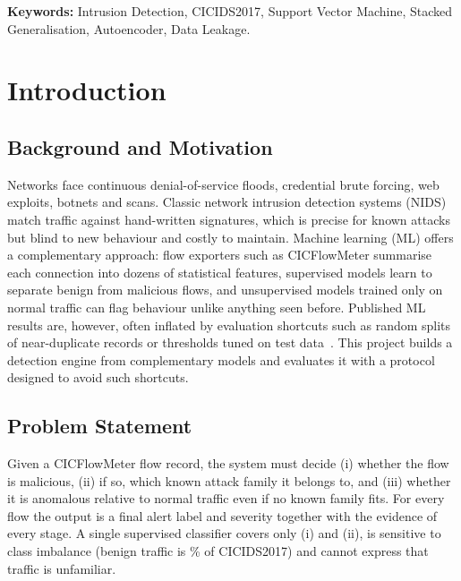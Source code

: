 \documentclass[12pt,a4paper,oneside]{report}
\begin{document}
\vspace{0.3cm}
\noindent\textbf{Keywords:} Intrusion Detection, CICIDS2017, Support Vector Machine, Stacked Generalisation, Autoencoder, Data Leakage.
\clearpage

\begin{singlespace}
\tableofcontents
\listoffigures
\listoftables
\end{singlespace}
\clearpage
{}

\chapter{Introduction}

\section{Background and Motivation}
Networks face continuous denial-of-service floods, credential brute forcing, web exploits, botnets and scans. Classic network intrusion detection systems (NIDS) match traffic against hand-written signatures, which is precise for known attacks but blind to new behaviour and costly to maintain. Machine learning (ML) offers a complementary approach: flow exporters such as CICFlowMeter summarise each connection into dozens of statistical features, supervised models learn to separate benign from malicious flows, and unsupervised models trained only on normal traffic can flag behaviour unlike anything seen before. Published ML results are, however, often inflated by evaluation shortcuts such as random splits of near-duplicate records or thresholds tuned on test data~\cite{arp2022dos,sommer2010outside}. This project builds a detection engine from complementary models and evaluates it with a protocol designed to avoid such shortcuts.

\section{Problem Statement}
Given a CICFlowMeter flow record, the system must decide (i) whether the flow is malicious, (ii) if so, which known attack family it belongs to, and (iii) whether it is anomalous relative to normal traffic even if no known family fits. For every flow the output is a final alert label and severity together with the evidence of every stage. A single supervised classifier covers only (i) and (ii), is sensitive to class imbalance (benign traffic is \BenignPct\% of CICIDS2017) and cannot express that traffic is unfamiliar.
\end{document}
